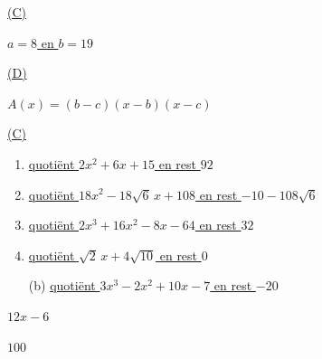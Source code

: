 \documentclass{ximera}
\begin{document}
\begin{oplossing} 
\hyperlink{oef3.9}{(C)}
\end{oplossing} 

\begin{oplossing} 
\hyperlink{oef3.10}{$a = 8$ en $b = 19$}
\end{oplossing} 

\begin{oplossing} 
\hyperlink{oef3.11}{(D)}
\end{oplossing} 

\begin{oplossing} 
\hyperlink{oef3.12}{$A(x) = (b-c)(x-b)(x-c)$}
\end{oplossing} 

\begin{oplossing} 
\hyperlink{oef3.13}{(C)}
\end{oplossing} 

\begin{oplossing} 
\begin{enumerate}
\item
\hyperlink{oef3.14}{quoti\"ent $2x^2+6x+15$ en rest $92$}
\item
\hyperlink{oef3.14}{quoti\"ent $18x^2 - 18\sqrt{6}\,x+108$ en rest $-10-108\sqrt{6}$}
\item
\hyperlink{oef3.14}{quoti\"ent $2x^3+16x^2-8x-64$ en rest $32$}
\item
\hyperlink{oef3.14}{quoti\"ent $\sqrt{2}\,x+4\sqrt{10}$ en rest $0$}
\end{enumerate}
\end{oplossing} 

\begin{oplossing} 
\begin{enumerate}
\item[(b)]
\hyperlink{oef3.15}{quoti\"ent $3x^3-2x^2+10x-7$ en rest $-20$}
\end{enumerate}
\end{oplossing} 

\begin{oplossing} 
\hyperlink{oef3.16}{$12x-6$}
\setcounter{enumi}{19}
\end{oplossing} 

\begin{oplossing} 
\hyperlink{oef3.20}{$100$}
\setcounter{enumi}{0}
\end{oplossing} 
\end{document}
